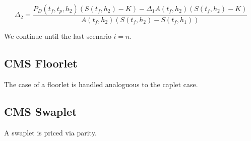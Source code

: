 \documentclass{amsart}
\theoremstyle{plain}
\numberwithin{equation}{section}
\begin{document}
\begin{equation}
\Delta_2 = \frac{P_D(t_f,t_p,h_2)(S(t_f,h_2)-K) - \Delta_1A(t_f,h_2)(S(t_f,h_2)-K)}{A(t_f,h_2)(S(t_f,h_2)-S(t_f,h_1))}
\end{equation} 

We continue until the last scenario $i=n$.

\subsection{CMS Floorlet}

The case of a floorlet is handled analoguous to the caplet case.

\subsection{CMS Swaplet}

A swaplet is priced via parity.
\end{document}
